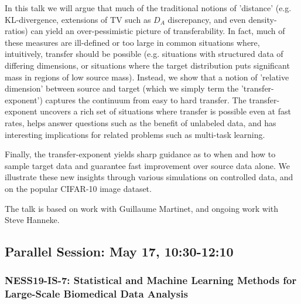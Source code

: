 \begin{itemize}
In this talk we will argue that much of the traditional notions of 'distance' (e.g. KL-divergence, extensions of 
TV such as $D_A$ discrepancy, and even density-ratios) can yield an over-pessimistic picture of transferability. 
In fact, much of these measures are ill-defined or too large in common situations where, intuitively, transfer should be possible (e.g. situations with structured data of differing dimensions, or situations where the target distribution puts significant mass in regions of low source mass). Instead, we show that a notion of 'relative dimension' between source and target (which we simply term the 'transfer-exponent') captures the continuum from easy to hard transfer. The transfer-exponent uncovers a rich set of situations where transfer is possible even at fast rates, helps answer questions such as the benefit of unlabeled data, and has interesting implications for related problems such as multi-task learning. 

Finally, the transfer-exponent yields sharp guidance as to when and how to sample target data and guarantee fast improvement over source data alone. We illustrate these new insights through various simulations on controlled data, and on the popular CIFAR-10 image dataset. 

The talk is based on work with Guillaume Martinet, and ongoing work with Steve Hanneke.

\end{itemize}

\subsection*{Parallel Session: May 17, 10:30-12:10}

\subsubsection*{NESS19-IS-7: Statistical and Machine Learning Methods for Large-Scale Biomedical Data Analysis}

